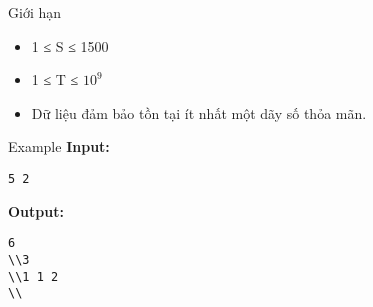 Giới hạn  
\begin{itemize}
	\item     1 ≤ S ≤ 1500   
	\item     1 ≤ T ≤ $10^{9}$
	\item     Dữ liệu đảm bảo tồn tại ít nhất một dãy số thỏa mãn.   
\end{itemize}
   Example  
\textbf{    Input:   }
\begin{verbatim}
5 2\end{verbatim}

\textbf{    Output:   }
\begin{verbatim}
6
\\3
\\1 1 2 
\\\end{verbatim}